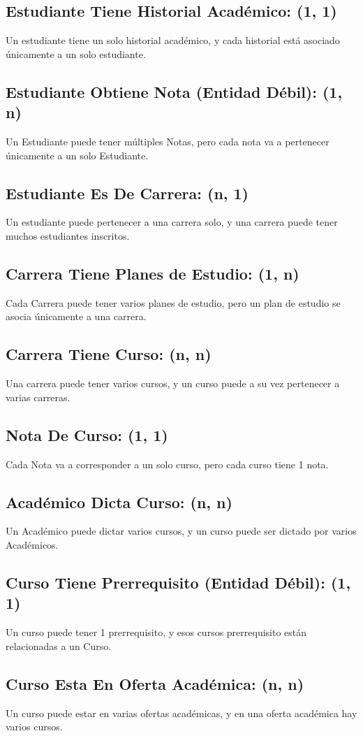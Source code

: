 \documentclass[12pt]{article}
\begin{document}
\subsection*{Estudiante Tiene Historial Académico: (1, 1)}
Un estudiante tiene un solo historial académico, y cada historial está asociado únicamente a un solo estudiante. 
\subsection*{Estudiante Obtiene Nota (Entidad Débil): (1, n)}
Un Estudiante puede tener múltiples Notas, pero cada nota va a pertenecer únicamente a un solo Estudiante. 
\subsection*{Estudiante Es De Carrera: (n, 1)}
Un estudiante puede pertenecer a una carrera solo, y una carrera puede tener muchos estudiantes inscritos.  
\subsection*{Carrera Tiene Planes de Estudio: (1, n)}
Cada Carrera puede tener varios planes de estudio, pero un plan de estudio se asocia únicamente a una carrera.  
\subsection*{Carrera Tiene Curso: (n, n)}
Una carrera puede tener varios cursos, y un curso puede a su vez pertenecer a varias carreras. 
\subsection*{Nota De Curso: (1, 1)}
Cada Nota va a corresponder a un solo curso, pero cada curso tiene 1 nota.
\subsection*{Académico Dicta Curso: (n, n)}
Un Académico puede dictar varios cursos, y un curso puede ser dictado por varios Académicos. 
\subsection*{Curso Tiene Prerrequisito (Entidad Débil): (1, 1)}
Un curso puede tener 1 prerrequisito, y esos cursos prerrequisito están relacionadas a un Curso.  
\subsection*{Curso Esta En Oferta Académica: (n, n)}
Un curso puede estar en varias ofertas académicas, y en una oferta académica hay varios cursos.
\end{document}
